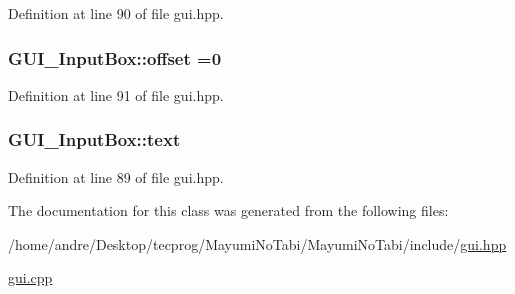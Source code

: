 Definition at line 90 of file gui.\-hpp.

\hypertarget{class_g_u_i___input_box_a410e0e66bc2a47eb7819078432ee0f15}{
\subsubsection[{offset}]{ G\-U\-I\-\_\-\-Input\-Box\-::offset =0\hspace{0.3cm}{\ttfamily [protected]}}}\label{class_g_u_i___input_box_a410e0e66bc2a47eb7819078432ee0f15}


Definition at line 91 of file gui.\-hpp.

\hypertarget{class_g_u_i___input_box_aade8911d4405c9659629e591c55095ed}{
\subsubsection[{text}]{ G\-U\-I\-\_\-\-Input\-Box\-::text\hspace{0.3cm}{\ttfamily [protected]}}}\label{class_g_u_i___input_box_aade8911d4405c9659629e591c55095ed}


Definition at line 89 of file gui.\-hpp.



The documentation for this class was generated from the following files\-:\begin{DoxyCompactItemize}
\item 
/home/andre/\-Desktop/tecprog/\-Mayumi\-No\-Tabi/\-Mayumi\-No\-Tabi/include/\hyperlink{gui_8hpp}{gui.\-hpp}\item 
\hyperlink{gui_8cpp}{gui.\-cpp}\end{DoxyCompactItemize}
